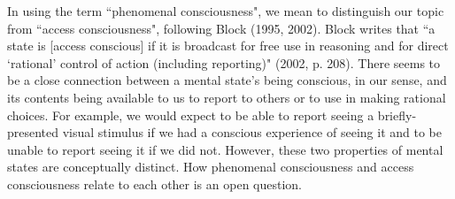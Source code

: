 \documentclass[12pt]{article}
\begin{document}
In using the term ``phenomenal consciousness", we mean to distinguish our topic from ``access consciousness", following Block (1995, 2002). Block writes that ``a state is [access conscious] if it is broadcast for free use in reasoning and for direct `rational' control of action (including reporting)" (2002, p. 208). There seems to be a close connection between a mental state’s being conscious, in our sense, and its contents being available to us to report to others or to use in making rational choices. For example, we would expect to be able to report seeing a briefly-presented visual stimulus if we had a conscious experience of seeing it and to be unable to report seeing it if we did not. However, these two properties of mental states are conceptually distinct. How phenomenal consciousness and access consciousness relate to each other is an open question.
\end{document}
